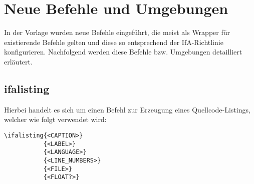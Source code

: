 \section{Neue Befehle und Umgebungen}
\label{sec:BefehleUndUmgebungen}

In der Vorlage wurden neue Befehle eingeführt, die meist als Wrapper für existierende Befehle gelten und diese so entsprechend der IfA-Richtlinie konfigurieren. Nachfolgend werden diese Befehle bzw. Umgebungen detailliert erläutert.

\subsection{ifalisting}
Hierbei handelt es sich um einen Befehl zur Erzeugung eines Quellcode-Listings, welcher wie folgt verwendet wird:

\begin{verbatim}
\ifalisting{<CAPTION>}
           {<LABEL>}
           {<LANGUAGE>}
           {<LINE_NUMBERS>}
           {<FILE>}
           {<FLOAT?>}
\end{verbatim}

